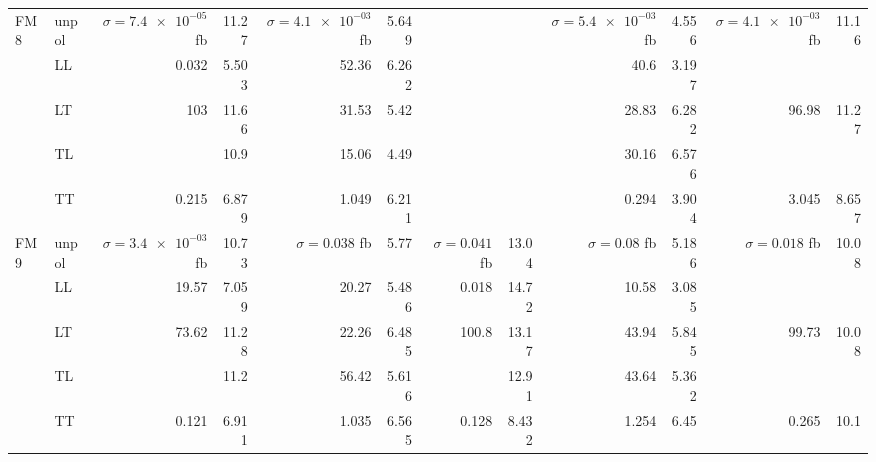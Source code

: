 \begin{table}[h]
{\begin{tabular}{llrrrrrrrrrr}
\midrule
\multirow{5}{*}{FM8}
 & unpol & $\sigma = \num{7.4e-05}$ fb & \num{11.27} & $\sigma = \num{4.1e-03}$ fb & \num{5.649} &  &  & $\sigma = \num{5.4e-03}$ fb & \num{4.556} & $\sigma = \num{4.1e-03}$ fb & \num{11.16} \\
 & LL & \num{0.032} & \num{5.503} & \num{52.36} & \num{6.262} &  &  & \num{40.6} & \num{3.197} &  &  \\
 & LT & \num{103} & \num{11.66} & \num{31.53} & \num{5.42} &  &  & \num{28.83} & \num{6.282} & \num{96.98} & \num{11.27} \\
 & TL &  & \num{10.9} & \num{15.06} & \num{4.49} &  &  & \num{30.16} & \num{6.576} &  &  \\
 & TT & \num{0.215} & \num{6.879} & \num{1.049} & \num{6.211} &  &  & \num{0.294} & \num{3.904} & \num{3.045} & \num{8.657} \\
\midrule
\multirow{5}{*}{FM9}
 & unpol & $\sigma = \num{3.4e-03}$ fb & \num{10.73} & $\sigma = \num{0.038}$ fb & \num{5.77} & $\sigma = \num{0.041}$ fb & \num{13.04} & $\sigma = \num{0.08}$ fb & \num{5.186} & $\sigma = \num{0.018}$ fb & \num{10.08} \\
 & LL & \num{19.57} & \num{7.059} & \num{20.27} & \num{5.486} & \num{0.018} & \num{14.72} & \num{10.58} & \num{3.085} &  &  \\
 & LT & \num{73.62} & \num{11.28} & \num{22.26} & \num{6.485} & \num{100.8} & \num{13.17} & \num{43.94} & \num{5.845} & \num{99.73} & \num{10.08} \\
 & TL &  & \num{11.2} & \num{56.42} & \num{5.616} &  & \num{12.91} & \num{43.64} & \num{5.362} &  &  \\
 & TT & \num{0.121} & \num{6.911} & \num{1.035} & \num{6.565} & \num{0.128} & \num{8.432} & \num{1.254} & \num{6.45} & \num{0.265} & \num{10.1} \\
\bottomrule
\end{tabular}
}%
\end{table}
\newpage
